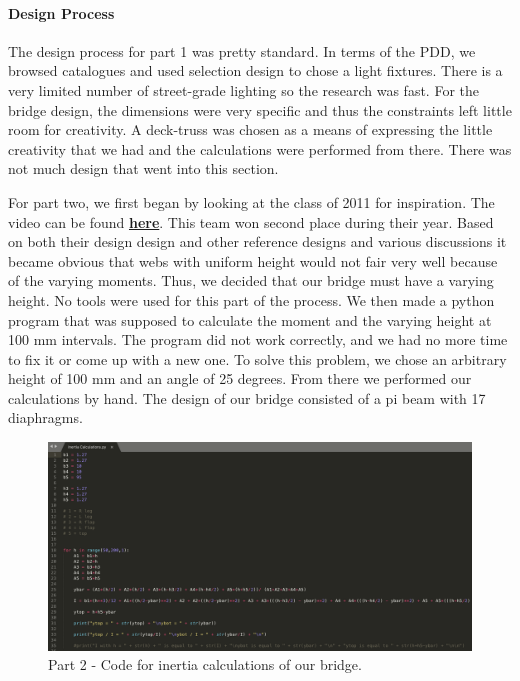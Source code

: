\documentclass[paper=a4, fontsize=11pt]{article} %
\begin{document}
        \paragraph{Design Process}
        The design process for part 1 was pretty standard. In terms of the PDD, we browsed catalogues and used selection design \cite{typesofdesign} to chose a light fixtures. There is a very limited number of street-grade lighting so the research was fast. For the bridge design, the dimensions were very specific and thus the constraints \cite{constraint} left little room for creativity. A deck-truss was chosen as a means of expressing the little creativity that we had and the calculations were performed from there. There was not much design that went into this section.
        
        For part two, we first began by looking at the class of 2011 for inspiration. The video can be found \href{https://www.youtube.com/watch?v=_g5RdcZs7tY}{\textbf{here}}. This team won second place during their year. Based on both their design design and other reference designs and various discussions it became obvious that webs with uniform height would not fair very well because of the varying moments. Thus, we decided that our bridge must have a varying height. No tools were used for this part of the process. We then made a python program that was supposed to calculate the moment and the varying height at 100 mm intervals. The program did not work correctly, and we had no more time to fix it or come up with a new one. To solve this problem, we chose an arbitrary height of 100 mm and an angle of 25 degrees. From there we performed our calculations by hand. The design of our bridge consisted of a pi beam with 17 diaphragms. 
        \begin{figure}[H]
            \centering
            \includegraphics[width=1\linewidth]{bridgecalcs.png}
            \caption{Part 2 - Code for inertia calculations of our bridge.}
        \end{figure}
\end{document}
